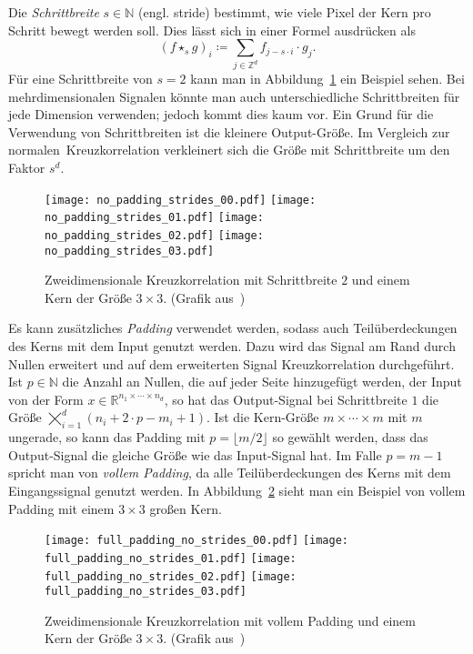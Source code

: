 \documentclass[paper=a4, 	%
		fontsize=11pt,
		abstract=true, 	%
		headsepline, 	%
		notitlepage	%
		]{scrartcl}
\theoremstyle{definition}
\newcommand{\R}{\mathbb{R}}
\newcommand{\Z}{\mathbb{Z}}
\newcommand{\N}{\mathbb{N}}
\begin{document}
Die \emph{Schrittbreite} $s\in\N$ (engl. \foreignlanguage{english}{stride}) bestimmt, wie viele Pixel der Kern pro Schritt bewegt werden soll.
Dies lässt sich in einer Formel ausdrücken als 
\[
    \left( f \star_s g \right)_i \coloneqq \sum_{j\in \Z^d} f_{j - s\cdot i} \cdot g_j.
\]
Für eine Schrittbreite von $s=2$ kann man in Abbildung~\ref{fig:cross-corr-with-stride} ein Beispiel sehen.
Bei mehrdimensionalen Signalen könnte man auch unterschiedliche Schrittbreiten für jede Dimension verwenden; jedoch kommt dies kaum vor.
Ein Grund für die Verwendung von Schrittbreiten ist die kleinere Output-Größe.
Im Vergleich zur \glqq normalen\grqq\ Kreuzkorrelation verkleinert sich die Größe mit Schrittbreite um den Faktor $s^d$.


\begin{figure}[ht]
    \centering
    \texttt{[image: no\_padding\_strides\_00.pdf]}
    \texttt{[image: no\_padding\_strides\_01.pdf]}
    \texttt{[image: no\_padding\_strides\_02.pdf]}
    \texttt{[image: no\_padding\_strides\_03.pdf]}
    \caption{Zweidimensionale Kreuzkorrelation mit Schrittbreite $2$ und einem Kern der Größe $3\times 3$. {\scriptsize (Grafik aus~\cite{dumoulin2016guide})}}
    \label{fig:cross-corr-with-stride}
\end{figure}

Es kann zusätzliches \emph{Padding} verwendet werden, sodass auch Teilüberdeckungen des Kerns mit dem Input genutzt werden.
Dazu wird das Signal am Rand durch Nullen erweitert und auf dem erweiterten Signal Kreuzkorrelation durchgeführt.
Ist $p\in\N$ die Anzahl an Nullen, die auf jeder Seite hinzugefügt werden, der Input von der Form $x\in\R^{n_1\times\cdots\times n_d}$, so hat das Output-Signal bei Schrittbreite $1$ die Größe $\bigtimes_{i=1}^d (n_i + 2\cdot p - m_i + 1)$.
Ist die Kern-Größe $m\times\cdots\times m$ mit $m$ ungerade, so kann das Padding mit $p=\lfloor m/2 \rfloor$ so gewählt werden, dass das Output-Signal die gleiche Größe wie das Input-Signal hat.
Im Falle $p=m-1$ spricht man von \emph{vollem Padding}, da alle Teilüberdeckungen des Kerns mit dem Eingangssignal genutzt werden.
In Abbildung~\ref{fig:cross-corr-with-padding} sieht man ein Beispiel von vollem Padding mit einem $3\times 3$ großen Kern.


\begin{figure}[ht]
    \centering
    \texttt{[image: full\_padding\_no\_strides\_00.pdf]}
    \texttt{[image: full\_padding\_no\_strides\_01.pdf]}
    \texttt{[image: full\_padding\_no\_strides\_02.pdf]}
    \texttt{[image: full\_padding\_no\_strides\_03.pdf]}
    \caption{Zweidimensionale Kreuzkorrelation mit vollem Padding und einem Kern der Größe $3\times 3$. {\scriptsize (Grafik aus~\cite{dumoulin2016guide})}}
    \label{fig:cross-corr-with-padding}
\end{figure}
\end{document}
